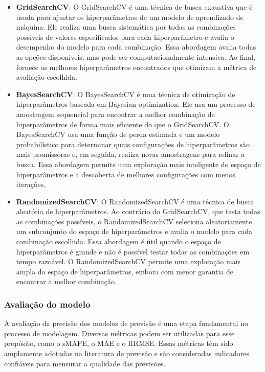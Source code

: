 \begin{itemize}
	\item \textbf{GridSearchCV}: O GridSearchCV é uma técnica de busca exaustiva que é usada para ajustar os hiperparâmetros de um modelo de aprendizado de máquina. Ele realiza uma busca sistemática por todas as combinações possíveis de valores especificados para cada hiperparâmetro e avalia o desempenho do modelo para cada combinação. Essa abordagem avalia todas as opções disponíveis, mas pode ser computacionalmente intensiva. Ao final, fornece os melhores hiperparâmetros encontrados que otimizam a métrica de avaliação escolhida.

\item \textbf{BayesSearchCV}: O BayesSearchCV é uma técnica de otimização de hiperparâmetros baseada em Bayesian optimization. Ele usa um processo de amostragem sequencial para encontrar a melhor combinação de hiperparâmetros de forma mais eficiente do que o GridSearchCV. O BayesSearchCV usa uma função de perda estimada e um modelo probabilístico para determinar quais configurações de hiperparâmetros são mais promissoras e, em seguida, realiza novas amostragens para refinar a busca. Essa abordagem permite uma exploração mais inteligente do espaço de hiperparâmetros e a descoberta de melhores configurações com menos iterações.

\item \textbf{RandomizedSearchCV}: O RandomizedSearchCV é uma técnica de busca aleatória de hiperparâmetros. Ao contrário do GridSearchCV, que testa todas as combinações possíveis, o RandomizedSearchCV seleciona aleatoriamente um subconjunto do espaço de hiperparâmetros e avalia o modelo para cada combinação escolhida. Essa abordagem é útil quando o espaço de hiperparâmetros é grande e não é possível testar todas as combinações em tempo razoável. O RandomizedSearchCV permite uma exploração mais ampla do espaço de hiperparâmetros, embora com menor garantia de encontrar a melhor combinação.
\end{itemize}

\subsubsection{Avalia\c c\~ao do modelo}


A avaliação da precisão dos modelos de previsão é uma etapa fundamental no processo de modelagem. Diversas métricas podem ser utilizadas para esse propósito, como o sMAPE, o MAE e o RRMSE. Essas métricas têm sido amplamente adotadas na literatura de previsão e são consideradas indicadores confiáveis para mensurar a qualidade das previsões.

